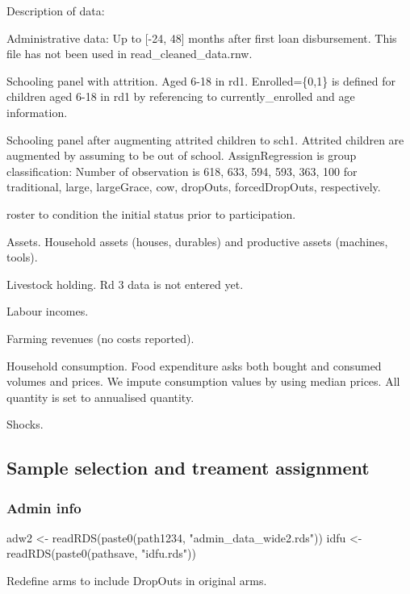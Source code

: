 Description of data:
\begin{description}
\vspace{1.0ex}\setlength{\itemsep}{1.0ex}\setlength{\baselineskip}{12pt}
\item[ad]	Administrative data: Up to [-24, 48] months after first loan disbursement. This file has not been used in \textsf{read\_cleaned\_data.rnw}.
\item[sch1]	Schooling panel with attrition. Aged 6-18 in rd1. \textsf{Enrolled=\{0,1\}} is defined for children aged 6-18 in rd1 by referencing to \textsf{currently\_enrolled} and age information.
\item[sch2]	Schooling panel after augmenting attrited children to \textsf{sch1}. Attrited children are augmented by assuming to be out of school. \textsf{AssignRegression} is group classification: Number of observation is \textsf{618, 633, 594, 593, 363, 100} for \textsf{traditional, large, largeGrace, cow, dropOuts, forcedDropOuts}, respectively.
\item[ros]	 \textsf{roster} to condition the initial status prior to participation.
\item[ass]	 Assets. Household assets (houses, durables) and productive assets (machines, tools). 
\item[lvo]	Livestock holding. Rd 3 data is not entered yet.
\item[lab]	Labour incomes.
\item[far]	Farming revenues (no costs reported).
\item[con]	Household consumption. Food expenditure asks both bought and consumed volumes and prices. We impute consumption values by using median prices. All quantity is set to annualised quantity.
\item[shk]	Shocks. 
\end{description}

\subsection{Sample selection and treament assignment}

\subsubsection{Admin info}

\begin{Schunk}
\begin{Sinput}
adw2 <- readRDS(paste0(path1234, "admin_data_wide2.rds"))
idfu <- readRDS(paste0(pathsave, "idfu.rds"))
\end{Sinput}
\end{Schunk}
Redefine arms to include \textsf{DropOuts} in original arms.

